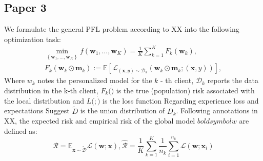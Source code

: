 \subsection{Paper 3}
We formulate the general PFL problem according to XX into the following optimization task:
\begin{align*}
    \min_{\left\{\boldsymbol{w}_1,\ldots,\boldsymbol{w}_K\right\}}f\left(\boldsymbol{w}_1,\ldots,\boldsymbol{w}_K\right)=\frac1K\sum_{k=1}^K F_k\left(\boldsymbol{w}_k\right),\\
    F_k\left(\boldsymbol{w}_k\odot\boldsymbol{m}_k\right):=\mathbb{E}\left[\mathcal{L}_{\left(\boldsymbol{x},y\right)\boldsymbol{\sim}\mathcal{D}_k}\left(\boldsymbol{w}_k\odot\boldsymbol{m}_k;\left(\boldsymbol{x},y\right)\right)\right],
\end{align*}
Where $w_k$ notes the personalized model for the $k$ - th client, $\mathcal{D}_k$ reports the data distribution in the k-th client, $F_k(\dot)$ is the true (population) risk associated with the local distribution and $L(\dot;\dot)$ is the loss function
Regarding experience loss and expectations
Suggest $\tilde{D}$ is the union distribution of $D_k$. Following annotations in XX, the expected risk and empirical risk of the global model $boldsymbol{w}$ are defined as:
\begin{equation*}
    \mathcal{R}=\mathbb{E}_{\boldsymbol{x}\sim\tilde{\mathcal{D}}}\mathcal{L}(\boldsymbol{w};\boldsymbol{x}),\hat{\mathcal{R}}=\frac1K\sum_{k=1}^K\frac1{n_k}\sum_{i=1}^{n_k}\mathcal{L}(\boldsymbol{w};\boldsymbol{x}_i)
\end{equation*}
